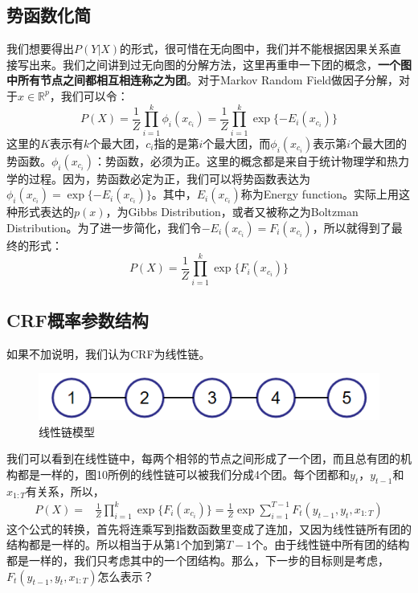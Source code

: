 \documentclass[a4paper]{article}
\begin{document}
\subsection{势函数化简}
我们想要得出\textbf{$P(Y|X)$}的形式，很可惜在无向图中，我们并不能根据因果关系直接写出来。我们之间讲到过无向图的分解方法，这里再重申一下团的概念，\textbf{一个图中所有节点之间都相互相连称之为团}。对于Markov Random Field做因子分解，对于$x\in \mathbb{R}^p$，我们可以令：
$$
P(X) = \frac{1}{Z} \prod_{i=1}^k \phi_i(x_{c_i}) = \frac{1}{Z} \prod_{i=1}^k \exp \{ -E_i(x_{c_i}) \}
$$
这里的$K$表示有$k$个最大团，$c_i$指的是第$i$个最大团，而$\phi_i(x_{c_i})$表示第$i$个最大团的势函数。$\phi_i(x_{c_i})$：势函数，必须为正。这里的概念都是来自于统计物理学和热力学的过程。因为，势函数必定为正，我们可以将势函数表达为$\phi_i(x_{c_i}) = \exp\{ -E_i(x_{c_i}) \}$。其中，$E_i(x_{c_i})$称为Energy function。实际上用这种形式表达的$p(x)$，为Gibbs Distribution，或者又被称之为Boltzman Distribution。为了进一步简化，我们令$-E_i(x_{c_i})=F_i(x_{c_i})$，所以就得到了最终的形式：
\begin{equation}
    P(X) = \frac{1}{Z} \prod_{i=1}^k \exp \{ F_i(x_{c_i}) \}
\end{equation}

\subsection{CRF概率参数结构}
如果不加说明，我们认为CRF为线性链。
\begin{figure}[H]
    \centering
    \includegraphics[width=.45\textwidth]{微信图片_20200223114928.png}
    \caption{线性链模型}
    \label{fig:my_label_1}
\end{figure}
我们可以看到在线性链中，每两个相邻的节点之间形成了一个团，而且总有团的机构都是一样的，图10所例的线性链可以被我们分成4个团。每个团都和$y_t$，$y_{t-1}$和$x_{1:T}$有关系，所以，
\begin{equation}
    \begin{split}
        P(X) 
        = & \frac{1}{Z} \prod_{i=1}^k \exp \{ F_i(x_{c_i}) \} = \frac{1}{Z} \exp \sum_{i=1}^{T-1} F_t(y_{t-1},y_t,x_{1:T})
    \end{split}
\end{equation}
这个公式的转换，首先将连乘写到指数函数里变成了连加，又因为线性链所有团的结构都是一样的。所以相当于从第1个加到第$T-1$个。由于线性链中所有团的结构都是一样的，我们只考虑其中的一个团结构。那么，下一步的目标则是考虑，$F_t(y_{t-1},y_t,x_{1:T})$怎么表示？
\end{document}
